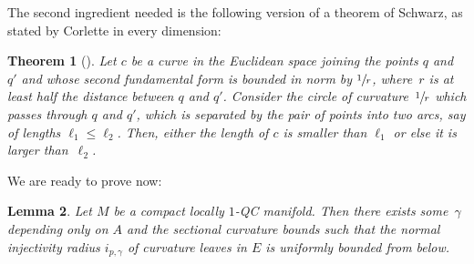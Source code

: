 \documentclass[10pt]{amsart}
\newtheorem{theorem}{Theorem}[section]
\newtheorem{lemma}[theorem]{Lemma}
\theoremstyle{definition}
\theoremstyle{remark}
\numberwithin{equation}{section}
\begin{document}
The second ingredient needed is the following version of a theorem of Schwarz, as stated by Corlette in every dimension:

\begin{theorem}[{\cite[Th.\,2.3]{Cor}}]\label{Schwarz}
Let $c$ be a curve in the Euclidean space joining the points $q$ and $q'$ and whose second fundamental form is
bounded in norm by $\sfrac{1}{r}$, where~$r$ is at least half the distance between $q$ and $q'$.
Consider the circle of curvature~$\sfrac{1}{r}$ which passes through $q$ and $q'$, which is separated
by the pair of points into two arcs, say of lengths $\ell_1 \leq \ell_2$.
Then, either the length of $c$ is smaller than $\ell_1$ or else it is larger than~$\ell_2$.
\end{theorem}

We are ready to prove now:
\begin{lemma}\label{localnormal}
Let $M$ be a compact locally $1$-QC manifold. Then there exists some~$\gamma$ depending only on $A$ and the sectional curvature bounds
such that the normal injectivity radius $i_{p,\gamma}$ of curvature leaves in $E$ is
uniformly bounded from below.
\end{lemma}
\end{document}
